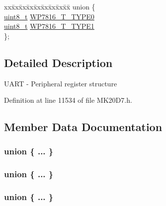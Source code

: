 \begin{DoxyCompactItemize}
\begin{tabbing}
\end{tabbing}\item 
\begin{tabbing}
xx\=xx\=xx\=xx\=xx\=xx\=xx\=xx\=xx\=\kill
union \{\\
\>\hyperlink{_p_e___types_8h_aba7bc1797add20fe3efdf37ced1182c5}{uint8\_t} \hyperlink{struct_u_a_r_t___mem_map_a5a6da05123820fc86d6f01d9d2464156}{WP7816\_T\_TYPE0}\\
\>\hyperlink{_p_e___types_8h_aba7bc1797add20fe3efdf37ced1182c5}{uint8\_t} \hyperlink{struct_u_a_r_t___mem_map_ab72e460a52f5caee734e5c92471a3060}{WP7816\_T\_TYPE1}\\
\}; \\

\end{tabbing}\end{DoxyCompactItemize}


\subsection{Detailed Description}
U\+A\+RT -\/ Peripheral register structure 

Definition at line 11534 of file M\+K20\+D7.\+h.



\subsection{Member Data Documentation}
\subsubsection[{\texorpdfstring{"@130}{@130}}]{\setlength{\rightskip}{0pt plus 5cm}union \{ ... \} }\hypertarget{struct_u_a_r_t___mem_map_acf98bd8faadcbf0532136e4e6d110898}{}\label{struct_u_a_r_t___mem_map_acf98bd8faadcbf0532136e4e6d110898}
\subsubsection[{\texorpdfstring{"@39}{@39}}]{\setlength{\rightskip}{0pt plus 5cm}union \{ ... \} }\hypertarget{struct_u_a_r_t___mem_map_a856d66bbc48000f49df444e64ea5a4b8}{}\label{struct_u_a_r_t___mem_map_a856d66bbc48000f49df444e64ea5a4b8}
\subsubsection[{\texorpdfstring{"@90}{@90}}]{\setlength{\rightskip}{0pt plus 5cm}union \{ ... \} }\hypertarget{struct_u_a_r_t___mem_map_a4b6019d48e6066b8d54210c6995e2bb2}{}\label{struct_u_a_r_t___mem_map_a4b6019d48e6066b8d54210c6995e2bb2}
